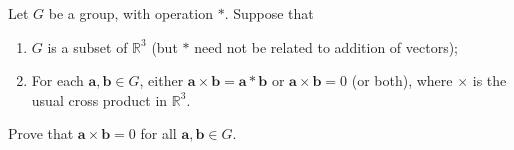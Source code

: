 Let $G$ be a group, with operation $*$. Suppose that
\begin{enumerate}[label=(\roman*)]
	\item $G$ is a subset of $\mathbb{R}^3$ (but $*$ need not be related to addition of vectors);
	\item For each $\mathbf{a},\mathbf{b}\in G$, either $\mathbf{a}\times\mathbf{b}=\mathbf{a}*\mathbf{b}$ or $\mathbf{a}\times\mathbf{b}=0$ (or both), where $\times$ is the usual cross product in $\mathbb{R}^3$.
\end{enumerate}
Prove that $\mathbf{a}\times\mathbf{b}=0$ for all $\mathbf{a},\mathbf{b}\in G$.